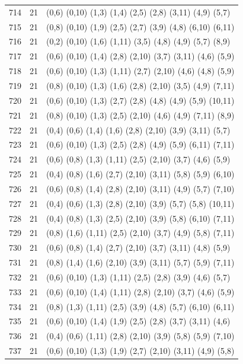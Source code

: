 {\begin{longtable}{lll}
714 & 21 & (0,6) (0,10) (1,3) (1,4) (2,5) (2,8) (3,11) (4,9) (5,7) \\
715 & 21 & (0,8) (0,10) (1,9) (2,5) (2,7) (3,9) (4,8) (6,10) (6,11) \\
716 & 21 & (0,2) (0,10) (1,6) (1,11) (3,5) (4,8) (4,9) (5,7) (8,9) \\
717 & 21 & (0,6) (0,10) (1,4) (2,8) (2,10) (3,7) (3,11) (4,6) (5,9) \\
718 & 21 & (0,6) (0,10) (1,3) (1,11) (2,7) (2,10) (4,6) (4,8) (5,9) \\
719 & 21 & (0,8) (0,10) (1,3) (1,6) (2,8) (2,10) (3,5) (4,9) (7,11) \\
720 & 21 & (0,6) (0,10) (1,3) (2,7) (2,8) (4,8) (4,9) (5,9) (10,11) \\
721 & 21 & (0,8) (0,10) (1,3) (2,5) (2,10) (4,6) (4,9) (7,11) (8,9) \\
722 & 21 & (0,4) (0,6) (1,4) (1,6) (2,8) (2,10) (3,9) (3,11) (5,7) \\
723 & 21 & (0,6) (0,10) (1,3) (2,5) (2,8) (4,9) (5,9) (6,11) (7,11) \\
724 & 21 & (0,6) (0,8) (1,3) (1,11) (2,5) (2,10) (3,7) (4,6) (5,9) \\
725 & 21 & (0,4) (0,8) (1,6) (2,7) (2,10) (3,11) (5,8) (5,9) (6,10) \\
726 & 21 & (0,6) (0,8) (1,4) (2,8) (2,10) (3,11) (4,9) (5,7) (7,10) \\
727 & 21 & (0,4) (0,6) (1,3) (2,8) (2,10) (3,9) (5,7) (5,8) (10,11) \\
728 & 21 & (0,4) (0,8) (1,3) (2,5) (2,10) (3,9) (5,8) (6,10) (7,11) \\
729 & 21 & (0,8) (1,6) (1,11) (2,5) (2,10) (3,7) (4,9) (5,8) (7,11) \\
730 & 21 & (0,6) (0,8) (1,4) (2,7) (2,10) (3,7) (3,11) (4,8) (5,9) \\
731 & 21 & (0,8) (1,4) (1,6) (2,10) (3,9) (3,11) (5,7) (5,9) (7,11) \\
732 & 21 & (0,6) (0,10) (1,3) (1,11) (2,5) (2,8) (3,9) (4,6) (5,7) \\
733 & 21 & (0,6) (0,10) (1,4) (1,11) (2,8) (2,10) (3,7) (4,6) (5,9) \\
734 & 21 & (0,8) (1,3) (1,11) (2,5) (3,9) (4,8) (5,7) (6,10) (6,11) \\
735 & 21 & (0,6) (0,10) (1,4) (1,9) (2,5) (2,8) (3,7) (3,11) (4,6) \\
736 & 21 & (0,4) (0,6) (1,11) (2,8) (2,10) (3,9) (5,8) (5,9) (7,10) \\
737 & 21 & (0,6) (0,10) (1,3) (1,9) (2,7) (2,10) (3,11) (4,9) (5,8) \\
\end{longtable}}



